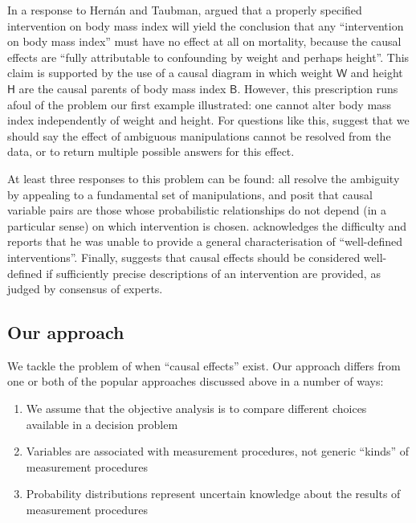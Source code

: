 \documentclass{article}
\theoremstyle{plain}
\theoremstyle{definition}
\newcommand{\RV}[1]{\ensuremath{\mathsf{#1}}}
\begin{document}
In a response to Hernán and Taubman, \citet{shahar_association_2009} argued that a properly specified intervention on body mass index will yield the conclusion that any ``intervention on body mass index'' must have no effect at all on mortality, because the causal effects are ``fully attributable to confounding by weight and perhaps height''. This claim is supported by the use of a causal diagram in which weight $\RV{W}$ and height $\RV{H}$ are the causal parents of body mass index $\RV{B}$. However, this prescription runs afoul of the problem our first example illustrated: one cannot alter body mass index independently of weight and height. For questions like this, \citet{spirtes_causal_2004} suggest that we should say the effect of ambiguous manipulations cannot be resolved from the data, or to return multiple possible answers for this effect.

At least three responses to this problem can be found: \citet{spirtes_causal_2004,eberhardt_contemporary_2022,chalupka_causal_2017} all resolve the ambiguity by appealing to a fundamental set of manipulations, and posit that causal variable pairs are those whose probabilistic relationships do not depend (in a particular sense) on which intervention is chosen. \citet{woodward_causation_2016} acknowledges the difficulty and reports that he was unable to provide a general characterisation of ``well-defined interventions''. Finally, \citet{noauthor_does_2016} suggests that causal effects should be considered well-defined if sufficiently precise descriptions of an intervention are provided, as judged by consensus of experts.

\subsection{Our approach}

We tackle the problem of when ``causal effects'' exist. Our approach differs from one or both of the popular approaches discussed above in a number of ways:

\begin{enumerate}
  \item We assume that the objective analysis is to compare different choices available in a decision problem
  \item Variables are associated with measurement procedures, not generic ``kinds'' of measurement procedures
  \item Probability distributions represent uncertain knowledge about the results of measurement procedures
\end{enumerate}
\end{document}
